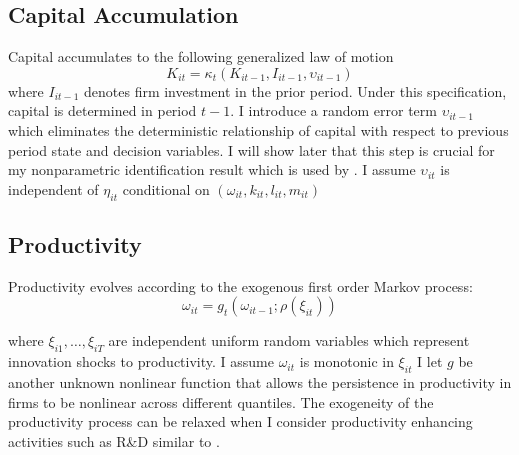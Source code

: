 \documentclass{article}
\begin{document}
\subsection*{Capital Accumulation}
Capital accumulates to the following generalized law of motion
\begin{equation} \label{modelK}
K_{it}=\kappa_{t}(K_{it-1}, I_{it-1}, \upsilon_{it-1})
\end{equation}
where $I_{it-1}$ denotes firm investment in the prior period. Under this specification, capital is determined in period $t-1$. I introduce a random error term $\upsilon_{it-1}$ which eliminates the deterministic relationship of capital with respect to previous period state and decision variables. I will show later that this step is crucial for my nonparametric identification result which is used by \cite{Hu2019}. I assume $\upsilon_{it}$ is independent of $\eta_{it}$ conditional on $(\omega_{it}, k_{it}, l_{it}, m_{it})$

\subsection*{Productivity}
Productivity evolves according to the exogenous first order Markov process:
\begin{equation}\label{modelw}
\omega_{it}=g_{t}(\omega_{it-1}; \rho(\xi_{it}))
\end{equation}

where $\xi_{i1},\dots, \xi_{iT}$ are independent uniform random variables which represent innovation shocks to productivity. I assume $\omega_{it}$ is monotonic in $\xi_{it}$ I let $g$ be another unknown nonlinear function that allows the persistence in productivity in firms to be nonlinear across different quantiles. The exogeneity of the productivity process can be relaxed when I consider productivity enhancing activities such as R\&D similar to \cite{Doraszelski2013}.
\end{document}
